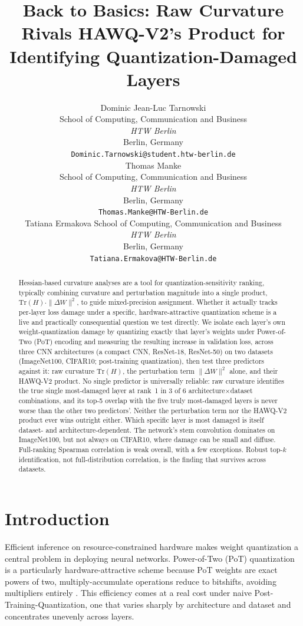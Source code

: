 \documentclass{article}
\title{Back to Basics: Raw Curvature Rivals HAWQ-V2's Product for Identifying Quantization-Damaged Layers}
\author{%
  Dominic Jean-Luc Tarnowski \\
  School of Computing, Communication and Business \\
  \textit{HTW Berlin}\\
  Berlin, Germany \\
  \texttt{Dominic.Tarnowski@student.htw-berlin.de} \\
\And
    Thomas Manke \\
    School of Computing, Communication and Business \\
  \textit{HTW Berlin}\\
  Berlin, Germany \\
    \texttt{Thomas.Manke@HTW-Berlin.de} \\
\And
    Tatiana Ermakova
    School of Computing, Communication and Business \\
  \textit{HTW Berlin}\\
  Berlin, Germany \\
  \texttt{Tatiana.Ermakova@HTW-Berlin.de} \\
    }
\begin{document}
\maketitle

\begin{abstract}
Hessian-based curvature analyses are a tool for quantization-sensitivity ranking, typically combining curvature and perturbation magnitude into a single product, $\mathrm{Tr}(H)\cdot\|\Delta W\|^2$, to guide mixed-precision assignment. Whether it actually tracks per-layer loss damage under a specific, hardware-attractive quantization scheme is a live and practically consequential question we test directly. We isolate each layer's own weight-quantization damage by quantizing exactly that layer's weights under Power-of-Two (PoT) encoding and measuring the resulting increase in validation loss, across three CNN architectures (a compact CNN, ResNet-18, ResNet-50) on two datasets (ImageNet100, CIFAR10; post-training quantization), then test three predictors against it: raw curvature $\mathrm{Tr}(H)$, the perturbation term $\|\Delta W\|^2$ alone, and their HAWQ-V2 product. No single predictor is universally reliable: raw curvature identifies the true single most-damaged layer at rank~1 in 3 of 6 architecture$\times$dataset combinations, and its top-5 overlap with the five truly most-damaged layers is never worse than the other two predictors'. Neither the perturbation term nor the HAWQ-V2 product ever wins outright either. Which specific layer is most damaged is itself dataset- and architecture-dependent. The network's stem convolution dominates on ImageNet100, but not always on CIFAR10, where damage can be small and diffuse. Full-ranking Spearman correlation is weak overall, with a few exceptions. Robust top-$k$ identification, not full-distribution correlation, is the finding that survives across datasets.
\end{abstract}

\section{Introduction}

Efficient inference on resource-constrained hardware makes weight quantization a central problem in deploying neural networks. Power-of-Two (PoT) quantization is a particularly hardware-attractive scheme because PoT weights are exact powers of two, multiply-accumulate operations reduce to bitshifts, avoiding multipliers entirely \citep{miyashita_pot_2016,przewlocka_rus_pot_2022}. This efficiency comes at a real cost under naive Post-Training-Quantization, one that varies sharply by architecture and dataset and concentrates unevenly across layers.
\end{document}
